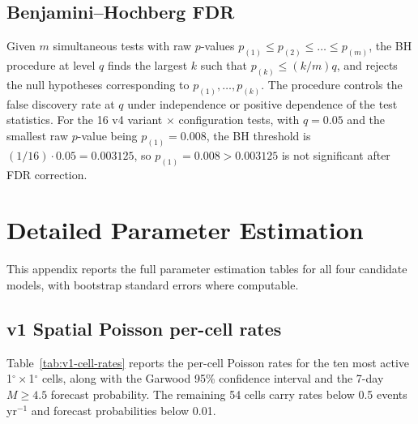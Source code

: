 \documentclass[10pt,a4paper,twocolumn]{article}
\begin{document}
\subsection{Benjamini--Hochberg FDR}\label{app:bh}

Given $m$ simultaneous tests with raw $p$-values $p_{(1)} \leq p_{(2)} \leq \dots \leq p_{(m)}$, the BH procedure at level $q$ finds the largest $k$ such that $p_{(k)} \leq (k/m) q$, and rejects the null hypotheses corresponding to $p_{(1)}, \dots, p_{(k)}$. The procedure controls the false discovery rate at $q$ under independence or positive dependence of the test statistics. For the 16 v4 variant $\times$ configuration tests, with $q=0.05$ and the smallest raw $p$-value being $p_{(1)} = 0.008$, the BH threshold is $(1/16)\cdot 0.05 = 0.003125$, so $p_{(1)} = 0.008 > 0.003125$ is not significant after FDR correction.

\section{Detailed Parameter Estimation}\label{app:parameters}

This appendix reports the full parameter estimation tables for all four candidate models, with bootstrap standard errors where computable.

\subsection{v1 Spatial Poisson per-cell rates}

Table~\ref{tab:v1-cell-rates} reports the per-cell Poisson rates for the ten most active 1$^\circ\times$1$^\circ$ cells, along with the Garwood 95\% confidence interval and the 7-day $M\geq4.5$ forecast probability. The remaining 54 cells carry rates below 0.5 events yr$^{-1}$ and forecast probabilities below 0.01.
\end{document}
